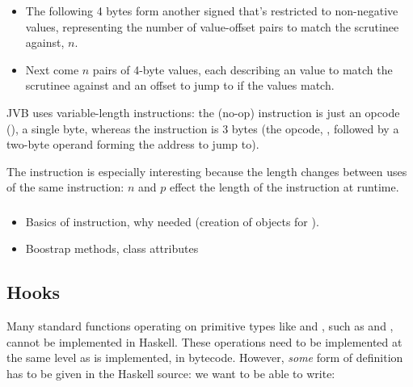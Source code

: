 \documentclass[dissertation.tex]{subfiles}
\begin{document}
{{{\begin{itemize}
{            }
            \item
            {

                The following 4 bytes form another signed  that's restricted to non-negative values,
                representing the number of value-offset pairs to match the scrutinee against, \(n\).

            }
            \item
            {

                Next come \(n\) pairs of 4-byte values, each describing an  value to match the scrutinee
                against and an offset to jump to if the values match.

            }
            \end{itemize}

            JVB uses variable-length instructions: the  (no-op) instruction is just an opcode
            (), a single byte, whereas the  instruction is 3 bytes (the opcode,
            , followed by a two-byte operand forming the address to jump to).

            The  instruction is especially interesting because the length changes between
            uses of the same instruction: \(n\) and \(p\) effect the length of the instruction at runtime.
        
        }
        \subsubsection{}
        {

            \begin{itemize}
            \item
            {
                Basics of instruction, why needed (creation of  objects for
                ).
            }
            \item Boostrap methods, class attributes
            \end{itemize}
        }
    }
    \subsection{Hooks}\label{sec:hooks}
    {

        Many standard functions operating on primitive types like  and , such as
        \haskell{(+)} and \haskell{(==)}, cannot be implemented in Haskell. These operations need to be implemented
        at the same level as  is implemented, in bytecode. However, \textit{some} form of definition
        has to be given in the Haskell source: we want to be able to write:

}}
\end{document}
